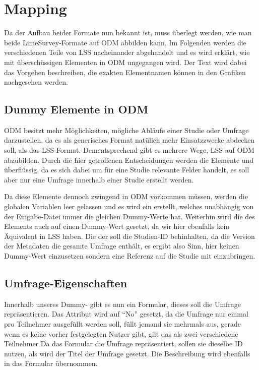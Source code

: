 \section{Mapping}

Da der Aufbau beider Formate nun bekannt ist, muss überlegt werden, wie man beide LimeSurvey-Formate auf ODM abbilden kann. Im Folgenden werden die verschiedenen Teile von LSS nacheinander abgehandelt und es wird erklärt, wie mit überschüssigen Elementen in ODM ungegangen wird.
Der Text wird dabei das Vorgehen beschreiben, die exakten Elementnamen können in den Grafiken nachgesehen werden.

\subsection{Dummy Elemente in ODM}


ODM besitzt mehr Möglichkeiten, mögliche Abläufe einer Studie oder Umfrage darzustellen, da es als generisches Format natülich mehr Einsatzzwecke abdecken soll, als das LSS-Format.
Dementsprechend gibt es mehrere Wege, LSS auf ODM abzubilden.
Durch die hier getroffenen Entscheidungen werden die Elemente  und  überflüssig,	da es sich dabei um für eine Studie relevante Felder handelt, es soll aber nur eine Umfrage innerhalb einer Studie erstellt werden.

Da diese Elemente dennoch zwingend in ODM vorkommen müssen, werden die globalen Variablen leer gelassen und es wird ein  erstellt, welches unabhängig von der Eingabe-Datei immer die gleichen Dummy-Werte hat.
Weiterhin wird die  des  Elements auch auf einen Dummy-Wert gesetzt, da wir hier ebenfalls kein Äquivalent in LSS haben.
Die  der  soll die Studien-ID behinhalten, da die Version der Metadaten die gesamte Umfrage enthält, es ergibt also Sinn, hier keinen Dummy-Wert einzusetzen sondern eine Referenz auf die Studie mit einzubringen.

\subsection{Umfrage-Eigenschaften}
\label{m:survey_meta}

Innerhalb unseres Dummy- gibt es nun ein Formular, dieses soll die Umfrage repräsentieren.
Das  Attribut wird auf \enquote{No} gesetzt, da die Umfrage nur einmal pro Teilnehmer ausgefüllt werden soll, füllt jemand sie mehrmals aus, gerade wenn es keine vorher festgelegten Nutzer gibt, gilt das als zwei verschiedene Teilnehmer %
Da das Formular die Umfrage repräsentiert, sollen sie dieselbe ID nutzen, als  wird der Titel der Umfrage gesetzt. Die Beschreibung wird ebenfalls in das Formular übernommen.

